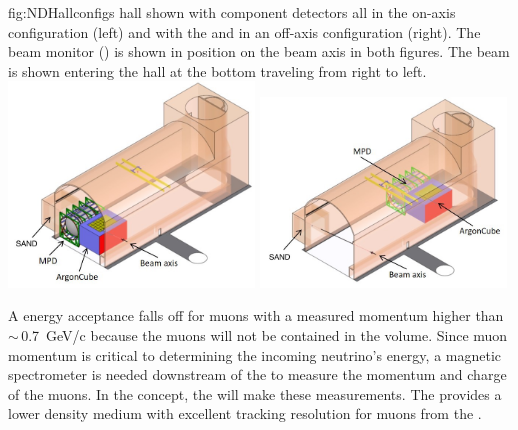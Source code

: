 \begin{dunefigure}
{fig:NDHallconfigs}
{  hall shown with component detectors all in the on-axis configuration (left) and with the  and  in an off-axis configuration (right). The 
beam monitor () is shown in position on the beam axis in both figures. The beam is shown entering the hall at the bottom traveling from right to left.}
\includegraphics[width=0.49\textwidth]{graphics/NDHall_onaxis.jpg}
\includegraphics[width=0.49\textwidth]{graphics/NDHall_offaxis.jpg}
\end{dunefigure}

A  energy acceptance falls off for muons with a measured momentum higher than $\sim\,$\SI{0.7}{GeV/c} because the muons will not be contained in the  volume.  Since muon momentum is critical to determining the incoming neutrino's energy, a magnetic spectrometer is needed downstream of the  to measure the momentum and charge of the muons.  %
In the   concept, the  will make these measurements. The  provides a lower density medium with excellent tracking resolution for muons from the .  



